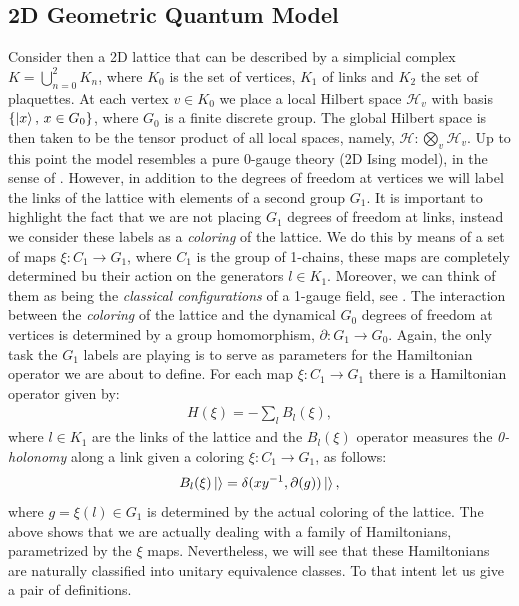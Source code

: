 \documentclass[a4paper,11pt]{article}
\theoremstyle{plain}%
\theoremstyle{definition}
\theoremstyle{remark}
\begin{document}
\subsection{2D Geometric Quantum Model }\label{sec:2Dmodel}
Consider then a 2D lattice that can be described by a simplicial complex \(K = \bigcup_{n=0}^2 K_n\), where \(K_0\) is the set of vertices, \(K_1\) of links and \(K_2\) the set of plaquettes. At each vertex \(v \in K_0\) we place a local Hilbert space \(\mathcal{H}_v\) with basis \(\{\ket{x}, \, x \in G_0\}\), where \(G_0\) is a finite discrete group. The global Hilbert space is then taken to be the tensor product of all local spaces, namely, \(\mathcal{H}: \bigotimes_v \mathcal{H}_v\). Up to this point the model resembles a pure 0-gauge theory (2D Ising model), in the sense of \cite{Matter, higher, higher-ent}. However, in addition to the degrees of freedom at vertices we will label the links of the lattice with elements of a second group \(G_1\). It is important to highlight the fact that we are not placing \(G_1\) degrees of freedom at links, instead we consider these labels as a \emph{coloring} of the lattice. We do this by means of a set of maps \(\xi: C_1 \rightarrow G_1\), where \(C_1\) is the group of 1-chains, these maps are completely determined bu their action on the generators \(l \in K_1\). Moreover, we can think of them as being the \emph{classical configurations} of a 1-gauge field, see \cite{higher, higher-ent}. The interaction between the \emph{coloring} of the lattice and the dynamical \(G_0\) degrees of freedom at vertices is determined by a group homomorphism, \(\partial: G_1 \rightarrow G_0\). Again, the only task the \(G_1\) labels are playing is to serve as parameters for the Hamiltonian operator we are about to define. For each map \(\xi: C_1 \rightarrow G_1\) there is a Hamiltonian operator given by:
\begin{align}\label{eq:Ham-2D}
H(\xi)= - \sum_l B_l(\xi),
\end{align}
where \(l \in K_1\) are the links of the lattice and the \(B_l(\xi)\) operator measures the \emph{0-holonomy} along a link given a coloring \(\xi: C_1 \rightarrow G_1\), as follows: 
\begin{align}\label{eq:0-hol}
B_l(\xi) \ket{} = \delta(xy^{-1}, \partial(g))\ket{},
\end{align}
where \(g= \xi(l) \in G_1\) is determined by the actual coloring of the lattice. The above shows that we are actually dealing with a family of Hamiltonians, parametrized by the \(\xi\) maps. Nevertheless, we will see that these Hamiltonians are naturally classified into unitary equivalence classes. To that intent let us give a pair of definitions.
\end{document}
